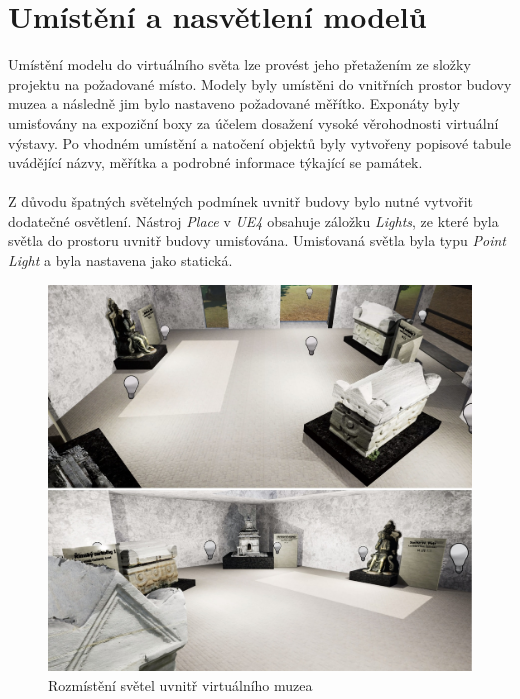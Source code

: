 \documentclass[a4paper, 12pt]{report}
\begin{document}
\section{Umístění a nasvětlení modelů}
Umístění modelu do virtuálního světa lze provést jeho přetažením  ze složky projektu na požadované místo. Modely byly umístěni do vnitřních prostor budovy muzea a následně jim bylo nastaveno požadované měřítko. Exponáty byly umisťovány na expoziční boxy za účelem dosažení vysoké věrohodnosti virtuální výstavy. Po vhodném umístění a natočení objektů byly vytvořeny popisové tabule uvádějící názvy, měřítka a podrobné informace týkající se památek. \\
\\
Z důvodu špatných světelných podmínek uvnitř budovy bylo nutné vytvořit dodatečné osvětlení. Nástroj \textit{Place} v \textit{UE4} obsahuje záložku \textit{Lights}, ze které byla světla do prostoru uvnitř budovy umisťována. Umisťovaná světla byla typu \textit{Point Light} a byla nastavena jako statická.

\begin{figure}[h!]
	\centering
	\includegraphics[width=16cm]{svetla.jpg}
	\caption{Rozmístění světel uvnitř virtuálního muzea}
\end{figure}
\end{document}
